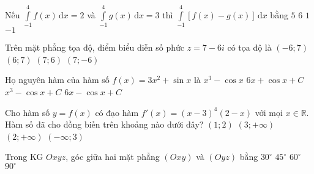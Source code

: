 \begin{ex}%
Nếu $\displaystyle\int\limits_{-1}^4f(x)\mathrm{\,d}x=2$ và $\displaystyle\int\limits_{-1}^4g(x)\mathrm{\,d}x=3$ thì $\displaystyle\int\limits_{-1}^4[f(x)-g(x)]\mathrm{\,d}x$ bằng
\choice
{$5$}
{$6$}
{$1$}
{\True $-1$}
\end{ex}

\begin{ex}%
Trên mặt phẳng tọa độ, điểm biểu diễn số phức $z=7-6i$ có tọa độ là
\choice
{$(-6;7)$}
{$(6;7)$}
{$(7;6)$}
{\True $(7;-6)$}
\end{ex}

\begin{ex}%
Họ nguyên hàm của hàm số $f(x)=3x^2+\sin x$ là
\choice
{$x^3-\cos x$}
{$6x+\cos x+C$}
{\True $x^3-\cos x+C$}
{$6x-\cos x+C$}
\end{ex}

\begin{ex}%
Cho hàm số $y=f(x)$ có đạo hàm $f'(x)=(x-3)^4(2-x)$ với mọi $x\in\mathbb{R}$. Hàm số đã cho đồng biến trên khoảng nào dưới đây?
\choice
{\True $(1;2)$}
{$(3;+\infty)$}
{$(2;+\infty)$}
{$(-\infty ;3)$}
\end{ex}

\begin{ex}%
Trong KG $Oxyz$, góc giữa hai mặt phẳng $(Oxy)$ và $(Oyz)$ bằng
\choice
{$30^\circ$}
{$45^\circ$}
{$60^\circ$}
{\True $90^\circ$}
\end{ex}

